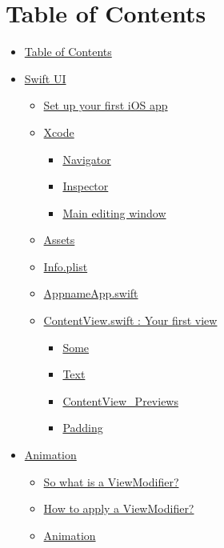 \documentclass[]{article}
\date{}
\providecommand{\tightlist}{%
  \setlength{\itemsep}{0pt}\setlength{\parskip}{0pt}}
\begin{document}
\hypertarget{table-of-contents}{%
\section{Table of Contents}\label{table-of-contents}}

\begin{itemize}
\tightlist
\item
  \protect\hyperlink{table-of-contents}{Table of Contents}
\item
  \protect\hyperlink{swift-ui}{Swift UI}

  \begin{itemize}
  \tightlist
  \item
    \protect\hyperlink{set-up-your-first-ios-app}{Set up your first iOS
    app}
  \item
    \protect\hyperlink{xcode}{Xcode}

    \begin{itemize}
    \tightlist
    \item
      \protect\hyperlink{navigator}{Navigator}
    \item
      \protect\hyperlink{inspector}{Inspector}
    \item
      \protect\hyperlink{main-editing-window}{Main editing window}
    \end{itemize}
  \item
    \protect\hyperlink{assets}{Assets}
  \item
    \protect\hyperlink{infoplist}{Info.plist}
  \item
    \protect\hyperlink{appnameappswift}{AppnameApp.swift}
  \item
    \protect\hyperlink{contentviewswift--your-first-view}{ContentView.swift
    : Your first view}

    \begin{itemize}
    \tightlist
    \item
      \protect\hyperlink{some}{Some}
    \item
      \protect\hyperlink{text}{Text}
    \item
      \protect\hyperlink{contentview_previews}{ContentView\_Previews}
    \item
      \protect\hyperlink{padding}{Padding}
    \end{itemize}
  \end{itemize}
\item
  \protect\hyperlink{animation}{Animation}

  \begin{itemize}
  \tightlist
  \item
    \protect\hyperlink{so-what-is-a-viewmodifier}{So what is a
    ViewModifier?}
  \item
    \protect\hyperlink{how-to-apply-a-viewmodifier}{How to apply a
    ViewModifier?}
  \item
    \protect\hyperlink{animation-1}{Animation}


\end{itemize}
\end{itemize}
\end{document}
